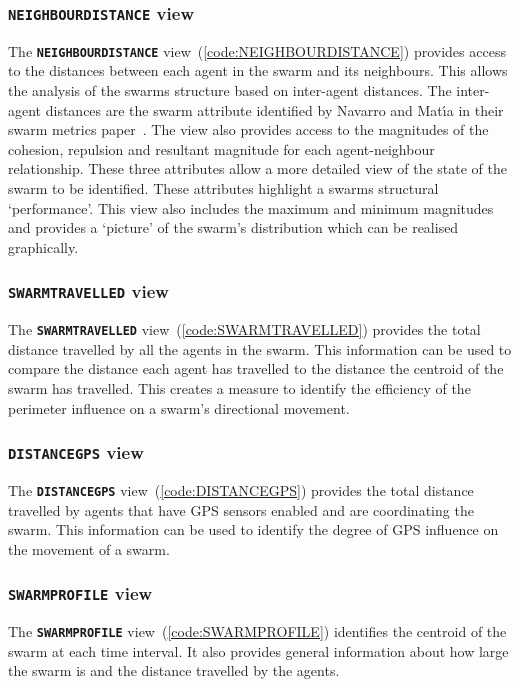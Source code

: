 \subsubsection{\texttt{\textbf{NEIGHBOURDISTANCE}} view}
The \texttt{\textbf{NEIGHBOURDISTANCE}} view~(\autoref{code:NEIGHBOURDISTANCE}) provides access to the distances between each agent in the swarm and its neighbours. This allows the analysis of the swarms structure based on inter-agent distances. The inter-agent distances are the swarm attribute identified by Navarro and Mat{\'\i}a in their swarm metrics paper~\cite{NIM:09}. The view also provides access to the magnitudes of the cohesion, repulsion and resultant magnitude for each agent-neighbour relationship. These three attributes allow a more detailed view of the state of the swarm to be identified. These attributes highlight a swarms structural `performance'. This view also includes the maximum and minimum magnitudes and provides a `picture' of the swarm's distribution which can be realised graphically.

\subsubsection{\texttt{\textbf{SWARMTRAVELLED}} view}
The \texttt{\textbf{SWARMTRAVELLED}} view~(\autoref{code:SWARMTRAVELLED}) provides the total distance travelled by all the agents in the swarm. This information can be used to compare the distance each agent has travelled to the distance the centroid of the swarm has travelled. This creates a measure to identify the efficiency of the perimeter influence on a swarm's directional movement.

\subsubsection{\texttt{\textbf{DISTANCEGPS}} view}
The \texttt{\textbf{DISTANCEGPS}} view~(\autoref{code:DISTANCEGPS}) provides the total distance travelled by agents that have GPS sensors enabled and are coordinating the swarm. This information can be used to identify the degree of GPS influence on the movement of a swarm. 

\subsubsection{\texttt{\textbf{SWARMPROFILE}} view}
The \texttt{\textbf{SWARMPROFILE}} view~(\autoref{code:SWARMPROFILE}) identifies the centroid of the swarm at each time interval. It also provides general information about how large the swarm is and the distance travelled by the agents.

